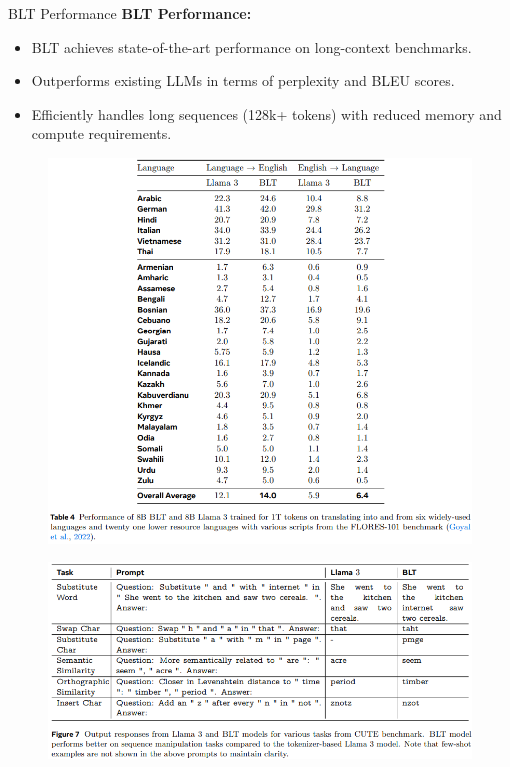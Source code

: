 \begin{frame}[allowframebreaks]{BLT Performance}
    \textbf{BLT Performance:}
    \begin{itemize}
        \item BLT achieves state-of-the-art performance on long-context benchmarks.
        \item Outperforms existing LLMs in terms of perplexity and BLEU scores.
        \item Efficiently handles long sequences (128k+ tokens) with reduced memory and compute requirements.
    \end{itemize}
\framebreak
    \begin{figure}
        \centering
        \includegraphics[height=0.9\textheight,width=1.05\textwidth,keepaspectratio]{images/recent-advance/blt-performance.png}
    \end{figure}
\framebreak
    \begin{figure}
        \centering
        \includegraphics[height=0.9\textheight,width=1.05\textwidth,keepaspectratio]{images/recent-advance/blt-llama-3.png}
    \end{figure}
\end{frame}